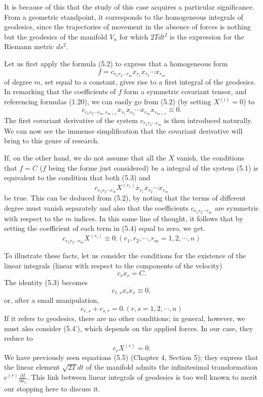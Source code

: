 \documentclass{book}
\begin{document}
It is because of this that the study of this case acquires a particular significance. From a geometric standpoint, it corresponds to the homogeneous integrals of geodesics, since the trajectories of movement in the absence of forces is nothing but the geodesics of the manifold $V_n$ for which $2Tdt^2$ is the expression for the Riemann metric $ds^2$. 

Let us first apply the formula (5.2) to express that a homogeneous form
$$f=c_{r_1r_2\cdots r_m}\dot{x}_{r_1}\dot{x}_{r_2}\cdots\dot{x}_{r_m}$$
of degree $m$, set equal to a constant, gives rise to a first integral of the geodesics. In remarking that the coefficients of $f$ form a symmetric covariant tensor, and referencing formulas (1.20), we can easily go from (5.2) (by setting $X^{(i)}=0$) to
\begin{equation}
c_{r_1r_2\cdots r_m,r_{m+1}}\dot{x}_{r_1}\dot{x}_{r_2}\cdots\dot{x}_{r_m}\dot{x}_{r_{m+1}}\equiv0.
\end{equation} 
The first covariant derivative of the system $c_{r_1r_2\cdots r_m}$ is then introduced naturally. We can now see the immense simplification that the covariant derivative will bring to this genre of research. 

If, on the other hand, we do not assume that all the $X$ vanish, the conditions that $f=C$ ($f$ being the forme just considered) be a integral of the system (5.1) is equivalent to the condition that both (5.3) and
\begin{equation}
c_{r_1r_2\cdots r_m}X^{(r_1)}\dot{x}_{r_1}\dot{x}_{r_2}\cdots\dot{x}_{r_m}
\end{equation}
be true. This can be deduced from (5.2), by noting that the terms of different degree must vanish separately and also that the coefficients $c_{r_1r_2\cdots r_m}$ are symmetric with respect to the $m$ indices. In this same line of thought, it follows that by setting the coefficient of each term in (5.4) equal to zero, we get. 
\begin{equation*}
c_{r_1r_2\cdots r_m}X^{(r_i)}\equiv0. (r_1,r_2,\cdots,r_m=1,2,\cdots,n)
\tag{5.4'}
\end{equation*}

To illustrate these facts, let us consider the conditions for the existence of the linear integrals (linear with respect to the components of the velocity)
$$c_r\dot{x}_r=C.$$
The identity (5.3) becomes
$$c_{r,s}\dot{x}_r\dot{x}_s\equiv0,$$
or, after a small manipulation,
\begin{equation}
c_{r,s}+c_{s,r}=0. (r,s=1,2,\cdots,n)
\end{equation}
If it refers to geodesics, there are no other conditions; in general, however, we must also consider (5.4'), which depends on the applied forces. In our case, they reduce to
\begin{equation}
c_rX^{(r)}=0.
\end{equation}
We have previously seen equations (5.5) (Chapter 4, Section 5); they express that the linear element $\sqrt{2T}dt$ of the manifold admits the infinitesimal transformation $c^{(r)}\frac{\partial f}{\partial x_r}$. This link between linear integrals of geodesics is too well known to merit our stopping here to discuss it.
\end{document}
